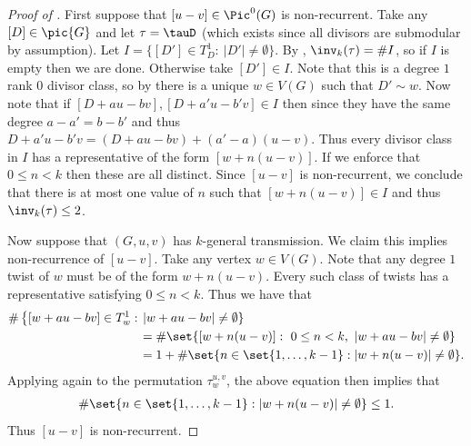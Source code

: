 \begin{proof}[Proof of ] \label{proof:kgtThetas}
First suppose that $[u-v] \in \Pic^0(G)$ is non-recurrent. Take any $[D] \in \pic{G}$ and let $\tau = \tauD$ (which exists since all divisors are submodular by assumption). Let $I  =\{ [D'] \in T^1_D:\ |D'| \neq \emptyset \}$. By , $\inv_k(\tau) = \# I$, so if $I$ is empty then we are done. Otherwise take $[D'] \in I$. Note that this is a degree $1$ rank $0$ divisor class, so by  there is a unique $w \in V(G)$ such that $D' \sim w$. Now note that if $[D+au-bv], [D+a'u-b'v] \in I$ then since they have the same degree $a-a' = b-b'$ and thus $D+a'u-b'v = (D+au-bv)+(a'-a)(u-v)$. Thus every divisor class in $I$ has a representative of the form $[w+n(u-v)]$. If we enforce that $0\leq n < k$ then these are all distinct. Since $[u-v]$ is non-recurrent, we conclude that there is at most one value of $n$ such that $[w+n(u-v)] \in I$ and thus $\inv_k(\tau) \leq 2$.

Now suppose that $(G,u,v)$ has $k$-general transmission. We claim this implies non-recurrence of $[u-v]$. Take any vertex $w \in V(G)$. Note that any degree $1$ twist of $w$ must be of the form $w + n(u-v)$. Every such class of twists has a representative satisfying $0\leq n <k$. Thus we have that
\begin{align*}
    \#\left\{[w+au-bv] \in T^1_w:\right.&\left.|w+au-bv|\neq \emptyset\right\} \\&= \#\set{[w+n(u-v)]:\ 0\leq n<k,\ |w+au-bv|\neq \emptyset }\\
    &= 1 + \#\set{n \in \set{1,\dots, k-1}:|w+n(u-v)| \neq \emptyset}.
\end{align*}
Applying  again to the permutation $\tau_{w}^{u,v}$, the above equation then implies that
\begin{align*}
    \#\set{n \in \set{1,\dots, k-1}:|w+n(u-v)| \neq \emptyset} \leq 1.
\end{align*}
Thus $[u-v]$ is non-recurrent.
\end{proof}

